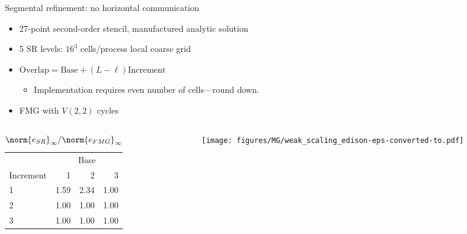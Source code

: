 \documentclass{beamer}
\begin{document}

\begin{frame}{Segmental refinement: no horizontal communication}
  \begin{itemize}
  \item 27-point second-order stencil, manufactured analytic solution
  \item 5 SR levels: $16^3$ cells/process local coarse grid
  \item $\text{Overlap} = \text{Base} + (L-\ell) \text{Increment}$
    \begin{itemize}
    \item Implementation requires even number of cells---round down.
    \end{itemize}
  \item FMG with $V(2,2)$ cycles
  \end{itemize}
  \begin{columns}
    \begin{column}{0.4\textwidth}
      \begin{table}\small
        \centering\caption{$\norm{e_{SR}}_\infty / \norm{e_{FMG}}_\infty$}\label{tab:sr-error}
        \begin{tabular}{l rrr}
          \toprule
          & \multicolumn{3}{c}{Base} \\
          Increment & 1 & 2 & 3 \\
          \midrule
          1 & {\color{red} 1.59} & {\color{red} 2.34} & 1.00 \\
          2 & 1.00 & 1.00 & 1.00 \\
          3 & 1.00 & 1.00 & 1.00 \\
          \bottomrule
        \end{tabular}
      \end{table}
    \end{column}
    \begin{column}{0.6\textwidth}
      \texttt{[image: figures/MG/weak\_scaling\_edison-eps-converted-to.pdf]}
    \end{column}
  \end{columns}
\end{frame}

\end{document}
